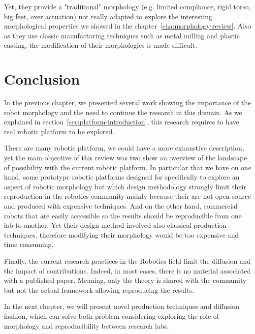 Yet, they provide a "traditional" morphology (e.g. limited compliance, rigid torso, big feet, over actuation) not really adapted to explore the interesting morphological properties we showed in the chapter~\ref{cha:morphology-review}. Also as they use classic manufacturing techniques such as metal milling and plastic casting, the modification of their morphologies is made difficult.

\section{Conclusion}

In the previous chapter, we presented several work showing the importance of the robot morphology and the need to continue the research in this domain. As we explained in section~\ref{sec:platform-introduction}, this research requires to have real robotic platform to be explored.

There are many robotic platform, we could have a more exhaustive description, yet the main objective of this review was two show an overview of the landscape of possibility with the current robotic platform. In particular that we have on one hand, some prototype robotic platforms designed for specifically to explore an aspect of robotic morphology but which design methodology strongly limit their reproduction in the robotics community mainly because their are not open source and produced with expensive techniques.
And on the other hand, commercial robots that are easily accessible so the results should be reproducible from one lab to another. Yet their design method involved also classical production techniques, therefore modifying their morphology would be too expensive and time consuming.

Finally, the current research practices in the Robotics field limit the diffusion and the impact of contributions.
Indeed, in most cases, there is no material associated with a published paper.
Meaning, only the theory is shared with the community but not the actual framework allowing reproducing the results.

In the next chapter, we will present novel production techniques and diffusion fashion, which can solve both problem considering exploring the role of morphology and reproducibility between research labs.






